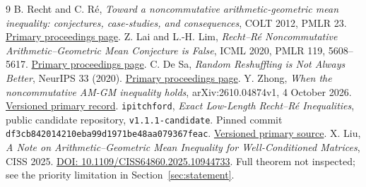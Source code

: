 \documentclass[11pt]{article}
\begin{document}
\begin{thebibliography}{9}
B. Recht and C. R\'e,
\emph{Toward a noncommutative arithmetic-geometric mean inequality:
conjectures, case-studies, and consequences}, COLT 2012, PMLR 23.
\href{https://proceedings.mlr.press/v23/recht12.html}{Primary proceedings page}.
Z. Lai and L.-H. Lim,
\emph{Recht--R\'e Noncommutative Arithmetic--Geometric Mean Conjecture
is False}, ICML 2020, PMLR 119, 5608--5617.
\href{https://proceedings.mlr.press/v119/lai20a.html}{Primary proceedings page}.
C. De Sa, \emph{Random Reshuffling is Not Always Better}, NeurIPS 33 (2020).
\href{https://proceedings.neurips.cc/paper/2020/hash/42299f06ee419aa5d9d07798b56779e2-Abstract.html}{Primary proceedings page}.
Y. Zhong, \emph{When the noncommutative AM-GM inequality holds},
arXiv:2610.04874v1, 4 October 2026.
\href{https://arxiv.org/abs/2610.04874v1}{Versioned primary record}.
\texttt{ipitchford}, \emph{Exact Low-Length Recht--R\'e Inequalities},
public candidate repository, \texttt{v1.1.1-candidate}.
Pinned commit \texttt{df3cb842014210eba99d1971be48aa079367feac}.
\href{https://github.com/ipitchford/exact-low-length-recht-re-inequalities/tree/df3cb842014210eba99d1971be48aa079367feac}{Versioned primary source}.
X. Liu, \emph{A Note on Arithmetic--Geometric Mean Inequality for
Well-Conditioned Matrices}, CISS 2025.
\href{https://doi.org/10.1109/CISS64860.2025.10944733}{DOI: 10.1109/CISS64860.2025.10944733}.
Full theorem not inspected; see the priority limitation in Section~\ref{sec:statement}.
\end{thebibliography}
\end{document}
